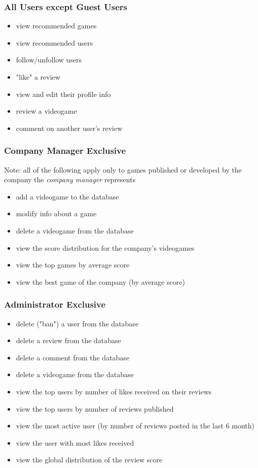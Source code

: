 \subsubsection{All Users except Guest Users}
\begin{itemize}
        \item view recommended games
	\item view recommended users
        \item follow/unfollow users
        \item "like" a review
	\item view and edit their profile info
        \item review a videogame
	\item comment on another user's review
\end{itemize}
\subsubsection{Company Manager Exclusive}
Note: all of the following apply only to games published or developed by the company the \emph{company manager} represents 
\begin{itemize}
	\item add a videogame to the database 
	\item modify info about a game 
	\item delete a videogame from the database 
	\item view the score distribution for the company's videogames
	\item view the top games by average score
	\item view the best game of the company (by average score)
\end{itemize}
\subsubsection{Administrator Exclusive}
\begin{itemize}
	\item delete ("ban") a user from the database
	\item delete a review from the database
	\item delete a comment from the database
	\item delete a videogame from the database 
	\item view the top users by number of likes received on their reviews
	\item view the top users by number of reviews published
	\item view the most active user (by number of reviews posted in the last 6 month)
	\item view the user with most likes received
	\item view the global distribution of the review score
\end{itemize}
